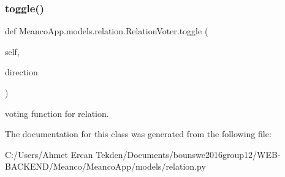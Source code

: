 \subsubsection{\texorpdfstring{toggle()}{toggle()}}
{\footnotesize\ttfamily def Meanco\+App.\+models.\+relation.\+Relation\+Voter.\+toggle (\begin{DoxyParamCaption}\item[{}]{self,  }\item[{}]{direction }\end{DoxyParamCaption})}



voting function for relation. 



The documentation for this class was generated from the following file\+:\begin{DoxyCompactItemize}
\item 
C\+:/\+Users/\+Ahmet Ercan Tekden/\+Documents/bounswe2016group12/\+W\+E\+B-\/\+B\+A\+C\+K\+E\+N\+D/\+Meanco/\+Meanco\+App/models/relation.\+py\end{DoxyCompactItemize}
